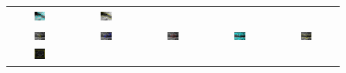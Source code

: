 \begin{figure}[t]
\begin{tabular}{@{}ccccc@{}}
\includegraphics[width=0.19\textwidth]{images/L2S_compare_region/US3_Li}	&
\includegraphics[width=0.19\textwidth]{images/L2S_compare_region/US3_ours}	
\\
\includegraphics[width=0.19\textwidth]{images/L2S_compare_region/US7_orig}	&
\includegraphics[width=0.19\textwidth]{images/L2S_compare_region/US7_CV}	&
\includegraphics[width=0.19\textwidth]{images/L2S_compare_region/US7_Lankton} &
\includegraphics[width=0.19\textwidth]{images/L2S_compare_region/US7_Li}	&
\includegraphics[width=0.19\textwidth]{images/L2S_compare_region/US7_ours}	
\\
\includegraphics[width=0.19\textwidth]{images/L2S_compare_region/yeast_orig}	&

\end{tabular}
\end{figure}
